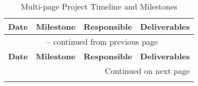 \documentclass[a4paper,11pt]{article}
\begin{document}
\begin{longtable}{p{2cm}p{4cm}p{3cm}p{4cm}}
\caption{Multi-page Project Timeline and Milestones} \\
\rowcolor{headerbg}
\textcolor{headertext}{\textbf{Date}} &
\textcolor{headertext}{\textbf{Milestone}} &
\textcolor{headertext}{\textbf{Responsible}} &
\textcolor{headertext}{\textbf{Deliverables}} \\
\toprule
\endfirsthead

\multicolumn{4}{c}{\tablename\ \thetable{} -- continued from previous page} \\
\rowcolor{headerbg}
\textcolor{headertext}{\textbf{Date}} &
\textcolor{headertext}{\textbf{Milestone}} &
\textcolor{headertext}{\textbf{Responsible}} &
\textcolor{headertext}{\textbf{Deliverables}} \\
\toprule
\endhead

\midrule \multicolumn{4}{r}{Continued on next page} \\
\endfoot

\bottomrule
\endlastfoot


\end{longtable}
\end{document}
